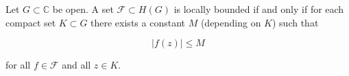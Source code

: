 Let $G \subset \mathbb{C}$ be open. A set $\mathcal{F} \subset H(G)$ is locally bounded if and only if for each compact set $K \subset G$ there exists a constant $M$ (depending on $K$) such that

$$|f(z)| \leq M$$

for all $f \in \mathcal{F}$ and all $z \in K$.
